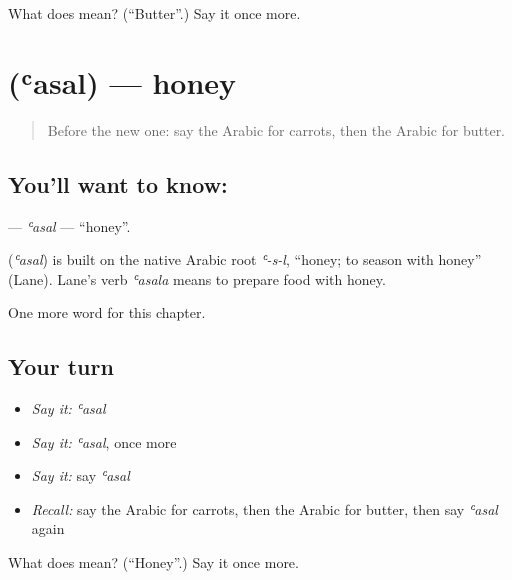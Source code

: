 \begin{tcolorbox}[breakable,colback=teal!4,colframe=teal!35!black,title={Before you move on}]
What does  mean? (\textquotedblleft{}Butter\textquotedblright{}.) Say it once more.
\end{tcolorbox}
\section[\texorpdfstring{\ar{عسل} (ʿasal)}{عسل (ʿasal)}]{ (ʿasal) — honey}

\label{lesson:AR-C67-asal}



\begin{quote}
Before the new one: say the Arabic for carrots, then the Arabic for butter.
\end{quote}

\subsection*{You'll want to know: }
\textbf{} — \emph{ʿasal} — \textquotedblleft{}honey\textquotedblright{}.

\begin{cousinweb}
\textbf{} (\emph{ʿasal}) is built on the native Arabic root \emph{ʿ-s-l}, \textquotedblleft{}honey; to season with honey\textquotedblright{} (Lane). Lane's verb \emph{ʿasala} means to prepare food with honey.
\end{cousinweb}

\begin{grammarlens}[title={What you've built}]
One more word for this chapter.
\end{grammarlens}

\subsection*{Your turn}
\begin{itemize}
\raggedright
  \item \emph{Say it:} \emph{ʿasal}
  \item \emph{Say it:} \emph{ʿasal}, once more
  \item \emph{Say it:} say \emph{ʿasal}
  \item \emph{Recall:} say the Arabic for carrots, then the Arabic for butter, then say \emph{ʿasal} again
\end{itemize}

\begin{tcolorbox}[breakable,colback=teal!4,colframe=teal!35!black,title={Before you move on}]
What does  mean? (\textquotedblleft{}Honey\textquotedblright{}.) Say it once more.
\end{tcolorbox}
